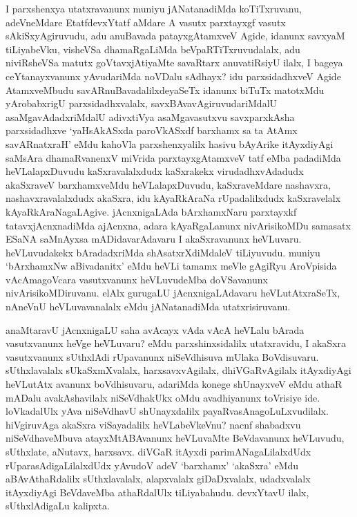 
\begin{artha}
I parxshenxya utatxravanunx muniyu jANatanadiMda koTiTxruvanu, adeVneMdare EtatfdevxYtatf aMdare A vasutx parxtayxgf vasutx sAkiSxyAgiruvudu, adu anuBavada patayxgAtamxveV Agide, idanunx savxyaM tiLiyabeVku, visheVSa dhamaRgaLiMda beVpaRTiTxruvudalalx, adu niviRsheVSa matutx goVtavxjAtiyaMte savaRtarx anuvatiRsiyU ilalx, I bageya ceYtanayxvanunx yAvudariMda noVDalu sAdhayx? idu parxsidadhxveV Agide AtamxveMbudu savARnuBavadalilxdeyaSeTx idanunx biTuTx matotxMdu yArobabxrigU parxsidadhxvalalx, savxBAvavAgiruvudariMdalU asaMgavAdadxriMdalU adivxtiVya asaMgavasutxvu savxparxkAsha parxsidadhxve `yaHsAkASxda paroVkASxdf barxhamx sa ta AtAmx savARnatxraH' eMdu kahoVla parxshenxyalilx hasivu bAyArike itAyxdiyAgi saMsAra dhamaRvanenxV miVrida parxtayxgAtamxveV tatf eMba padadiMda heVLalapxDuvudu kaSxravalalxdudx kaSxrakekx virudadhxvAdadudx akaSxraveV barxhamxveMdu heVLalapxDuvudu, kaSxraveMdare nashavxra, nashavxravalalxdudx akaSxra, idu kAyaRkAraNa rUpadalilxdudx kaSxravelalx kAyaRkAraNagaLAgive. jAcnxnigaLAda bArxhamxNaru parxtayxkf tatavxjAcnxnadiMda ajAcnxna, adara kAyaRgaLanunx  nivArisikoMDu samasatx ESaNA saMnAyxsa mADidavarAdavaru I akaSxravanunx heVLuvaru. heVLuvudakekx bAradadxriMda shAsatxrXdiMdaleV tiLiyuvudu. muniyu `bArxhamxNw aBivadanitx' eMdu heVLi tamamx meVle gAgiRyu AroVpisida vAcAmagoVcara vasutxvanunx heVLuvudeMba doVSavanunx nivArisikoMDiruvanu. elAlx gurugaLU jAcnxnigaLAdavaru heVLutAtxraSeTx, nAneVnU heVLuvavanalalx eMdu jANatanadiMda utatxrisiruvanu.
\end{artha}%


\begin{artha}
anaMtaravU jAcnxnigaLU saha avAcayx vAda vAcA heVLalu bArada vasutxvanunx heVge heVLuvaru? eMdu parxshinxsidalilx utatxravidu, I akaSxra vasutxvanunx sUthxlAdi rUpavanunx niSeVdhisuva mUlaka BoVdisuvaru. sUthxlavalalx sUkaSxmXvalalx, harxsavxvAgilalx, dhiVGaRvAgilalx itAyxdiyAgi heVLutAtx avanunx boVdhisuvaru, adariMda konege shUnayxveV eMdu athaR mADalu avakAshavilalx niSeVdhakUkx oMdu avadhiyanunx toVrisiye ide. loVkadalUlx yAva niSeVdhavU shUnayxdalilx payaRvasAnagoLuLxvudilalx. hiVgiruvAga akaSxra viSayadalilx heVLabeVkeVnu? nacnf shabadxvu niSeVdhaveMbuva atayxMtABAvanunx heVLuvaMte BeVdavanunx heVLuvudu, sUthxlate, aNutavx, harxsavx. diVGaR itAyxdi parimANagaLilalxdUdx rUparasAdigaLilalxdUdx yAvudoV adeV `barxhamx' `akaSxra' eMdu aBAvAthaRdalilx sUthxlavalalx, alapxvalalx giDaDxvalalx, udadxvalalx itAyxdiyAgi BeVdaveMba athaRdalUlx tiLiyabahudu. devxYtavU ilalx, sUthxlAdigaLu kalipxta.
\end{artha}%

